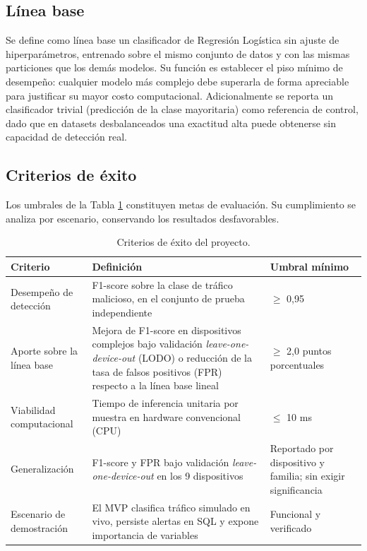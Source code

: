 \documentclass[11pt,a4paper]{article}
\begin{document}
\subsection{Línea base}
Se define como línea base un clasificador de Regresión Logística sin ajuste de hiperparámetros, entrenado sobre el mismo conjunto de datos y con las mismas particiones que los demás modelos. Su función es establecer el piso mínimo de desempeño: cualquier modelo más complejo debe superarla de forma apreciable para justificar su mayor costo computacional. Adicionalmente se reporta un clasificador trivial (predicción de la clase mayoritaria) como referencia de control, dado que en datasets desbalanceados una exactitud alta puede obtenerse sin capacidad de detección real.

\subsection{Criterios de éxito}
Los umbrales de la Tabla \ref{tab:criterios} constituyen metas de evaluación. Su cumplimiento se analiza por escenario, conservando los resultados desfavorables.

\begin{table}[H]
\centering
\caption{Criterios de éxito del proyecto.}
\label{tab:criterios}
\small
\begin{tabularx}{\textwidth}{p{4.2cm}X p{3.2cm}}
\toprule
\textbf{Criterio} & \textbf{Definición} & \textbf{Umbral mínimo} \\
\midrule
Desempeño de detección & F1-score sobre la clase de tráfico malicioso, en el conjunto de prueba independiente & $\geq$ 0,95 \\
Aporte sobre la línea base & Mejora de F1-score en dispositivos complejos bajo validación \textit{leave-one-device-out} (LODO) o reducción de la tasa de falsos positivos (FPR) respecto a la línea base lineal & $\geq$ 2,0 puntos porcentuales \\
Viabilidad computacional & Tiempo de inferencia unitaria por muestra en hardware convencional (CPU) & $\leq$ 10 ms \\
Generalización & F1-score y FPR bajo validación \textit{leave-one-device-out} en los 9 dispositivos & Reportado por dispositivo y familia; sin exigir significancia \\
Escenario de demostración & El MVP clasifica tráfico simulado en vivo, persiste alertas en SQL y expone importancia de variables & Funcional y verificado \\
\bottomrule
\end{tabularx}
\end{table}
\end{document}
